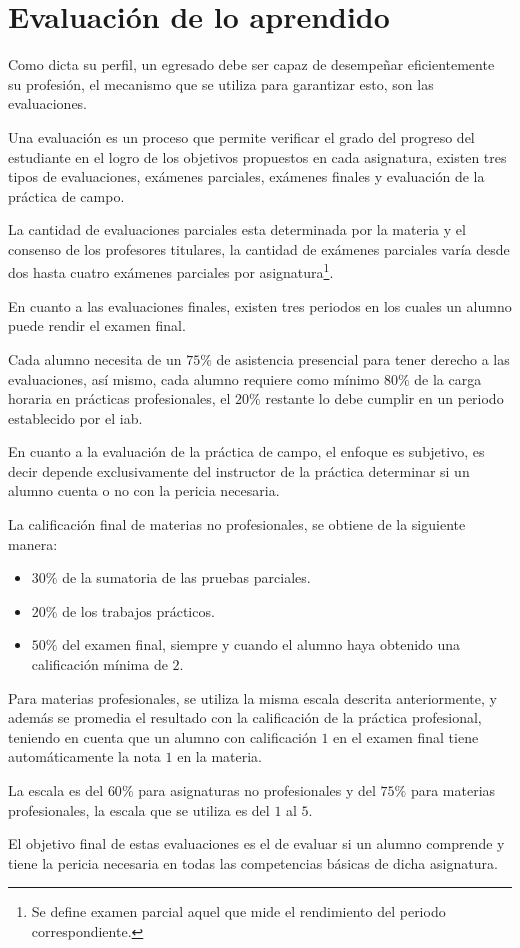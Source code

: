 \section{Evaluación de lo aprendido}
\label{sec:problema_evaluacion}

Como dicta su perfil, un egresado debe ser capaz de desempeñar eficientemente su
profesión, el mecanismo que se utiliza para garantizar esto, son las
evaluaciones.

Una evaluación es un proceso que permite verificar el grado del progreso del
estudiante en el logro de los objetivos propuestos en cada
asignatura\cite{iab:est_enfemeria}, existen tres tipos de evaluaciones, exámenes
parciales, exámenes finales y evaluación de la práctica de campo.

La cantidad de evaluaciones parciales esta determinada por la materia y el
consenso de los profesores titulares\cite{iab:est_enfemeria}, la cantidad de
exámenes parciales varía desde dos hasta cuatro exámenes parciales por
asignatura\footnote{Se define examen parcial aquel que mide el rendimiento del
    periodo correspondiente\cite{iab:est_enfemeria}.}.

En cuanto a las evaluaciones finales, existen tres periodos en los cuales un
alumno puede rendir el examen final.

Cada alumno necesita de un $75\%$ de asistencia presencial para tener derecho a
las evaluaciones, así mismo, cada alumno requiere como mínimo $80\%$ de la carga
horaria en prácticas profesionales, el $20\%$ restante lo debe cumplir en un
periodo establecido por el \Gls{iab}.

En cuanto a la evaluación de la práctica de campo, el enfoque es subjetivo, es
decir depende exclusivamente del instructor de la práctica determinar si un
alumno cuenta o no con la pericia necesaria.

La calificación final de materias no profesionales, se obtiene de la siguiente
manera\cite{iab:est_enfemeria}:

\begin{itemize}
    \item $30\%$ de la sumatoria de las pruebas parciales.
    \item $20\%$ de los trabajos prácticos.
    \item $50\%$ del examen final, siempre y cuando el alumno haya obtenido
        una calificación mínima de $2$.
\end{itemize}

Para materias profesionales, se utiliza la misma escala descrita anteriormente,
y además se promedia el resultado con la calificación de la práctica
profesional\cite{iab:est_enfemeria}, teniendo en cuenta que un alumno con
calificación $1$ en el examen final tiene automáticamente la nota $1$ en la
materia\cite{iab:est_enfemeria}.

La escala es del $60\%$ para asignaturas no profesionales y del $75\%$ para
materias profesionales, la escala que se utiliza es del $1$ al $5$.

El objetivo final de estas evaluaciones es el de evaluar si un alumno comprende
y tiene la pericia necesaria en todas las competencias básicas de dicha
asignatura.
